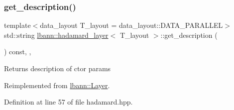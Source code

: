 \subsubsection{\texorpdfstring{get\+\_\+description()}{get\_description()}}
{\footnotesize\ttfamily template$<$data\+\_\+layout T\+\_\+layout = data\+\_\+layout\+::\+D\+A\+T\+A\+\_\+\+P\+A\+R\+A\+L\+L\+EL$>$ \\
std\+::string \hyperlink{classlbann_1_1hadamard__layer}{lbann\+::hadamard\+\_\+layer}$<$ T\+\_\+layout $>$\+::get\+\_\+description (\begin{DoxyParamCaption}{ }\end{DoxyParamCaption}) const\hspace{0.3cm}{\ttfamily [inline]}, {\ttfamily [override]}, {\ttfamily [virtual]}}

Returns description of ctor params 

Reimplemented from \hyperlink{classlbann_1_1Layer_acc0803d3428914ca1eb5988c4309174a}{lbann\+::\+Layer}.



Definition at line 57 of file hadamard.\+hpp.


